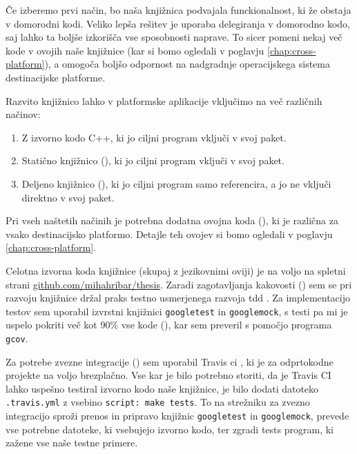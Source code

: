 Če izberemo prvi način, bo naša knjižnica podvajala funckionalnost, ki že obstaja v domorodni kodi. Veliko lepša rešitev je uporaba delegiranja v domorodno kodo, saj lahko ta boljše izkorišča vse sposobnosti naprave. To sicer pomeni nekaj več kode v ovojih naše knjižnice (kar si bomo ogledali v poglavju \ref{chap:cross-platform}), a omogoča boljšo odpornost na nadgradnje operacijskega sistema destinacijske platforme.

Razvito knjižnico lahko v platformske aplikacije vključimo na več različnih načinov:

\begin{enumerate}
  \item Z izvorno kodo C++, ki jo ciljni program vključi v svoj paket.
  \item Statično knjižnico (), ki jo ciljni program vključi v svoj paket.
  \item Deljeno knjižnico (), ki jo ciljni program samo referencira, a jo ne vključi direktno v svoj paket.
\end{enumerate}

Pri vseh naštetih načinih je potrebna dodatna ovojna koda (), ki je različna za vsako destinacijsko platformo. Detajle teh ovojev si bomo ogledali v poglavju \ref{chap:cross-platform}.

Celotna izvorna koda knjižnice (skupaj z jezikovnimi oviji) je na voljo na spletni strani \href{https://github.com/mihahribar/thesis}{github.com/mihahribar/thesis}. Zaradi zagotavljanja kakovosti () sem se pri razvoju knjižnice držal praks testno usmerjenega razvoja \gls{tdd} \cite{tdd-cpp}. Za implementacijo testov sem uporabil izvrstni knjižnici \texttt{googletest}\cite{googletest} in \texttt{googlemock}\cite{googlemock}, s testi pa mi je uspelo pokriti več kot 90\% vse kode (), kar sem preveril s pomočjo programa \texttt{gcov}.

Za potrebe zvezne integracije () sem uporabil Travis \gls{ci} \cite{travisci}, ki je za odprtokodne projekte na voljo brezplačno. Vse kar je bilo potrebno storiti, da je Travis CI lahko uspešno testiral izvorno kodo naše knjižnice, je bilo dodati datoteko \texttt{.travis.yml} z vsebino \texttt{script: make tests}. To na strežniku za zvezno integracijo sproži prenos in pripravo knjižnic \texttt{googletest} in \texttt{googlemock}, prevede vse potrebne datoteke, ki vsebujejo izvorno kodo, ter zgradi tests program, ki zažene vse naše testne primere.

